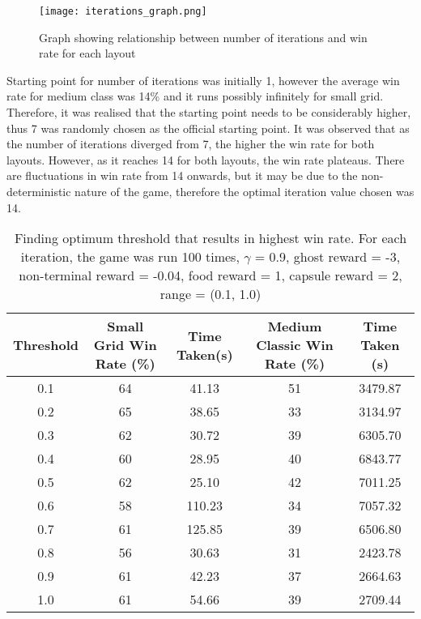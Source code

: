 \documentclass[12pt]{report}
\begin{document}
        \begin{figure}[H]
          \centering
          \texttt{[image: iterations\_graph.png]}
          \caption{Graph showing relationship between number of iterations and win rate for each layout}
        \end{figure}
        Starting point for number of iterations was initially 1, however the average win rate for medium class was 14\% and it runs possibly infinitely for small grid. Therefore, it was realised that the starting point needs to be considerably higher, thus 7 was randomly chosen as the official starting point. It was observed that as the number of iterations diverged from 7, the higher the win rate for both layouts. However, as it reaches 14 for both layouts, the win rate plateaus. There are fluctuations in win rate from 14 onwards, but it may be due to the non-deterministic nature of the game, therefore the optimal iteration value chosen was 14.
        \begin{table}[H]
          \begin{center}
            \begin{adjustbox}{max width=\textwidth}
            \begin{tabular}{*{5}{|c}|}

              \textbf{Threshold} & \textbf{Small Grid Win Rate (\%)} & \textbf{Time Taken(s)} & \textbf{Medium Classic Win Rate (\%)} & \textbf{Time Taken (s)}\\
              \hline
              0.1 & 64 & 41.13 & 51 & 3479.87\\
              0.2 & 65 & 38.65 & 33 & 3134.97\\
              0.3 & 62 & 30.72 & 39 & 6305.70\\
              0.4 & 60 & 28.95 & 40 & 6843.77\\
              0.5 & 62 & 25.10 & 42 & 7011.25\\
              0.6 & 58 & 110.23 & 34 & 7057.32\\
              0.7 & 61 & 125.85 & 39 & 6506.80\\
              0.8 & 56 & 30.63 & 31 & 2423.78\\
              0.9 & 61 & 42.23 & 37 & 2664.63\\
              1.0 & 61 & 54.66 & 39 & 2709.44\\
            \end{tabular}
            \end{adjustbox}
            \caption{Finding optimum threshold that results in highest win rate. For each iteration, the game was run 100 times, $\gamma$ = 0.9, ghost reward = -3, non-terminal reward = -0.04, food reward = 1, capsule reward = 2, range = (0.1, 1.0)}
            \label{tab:table3}
          \end{center}
        \end{table}
\end{document}
